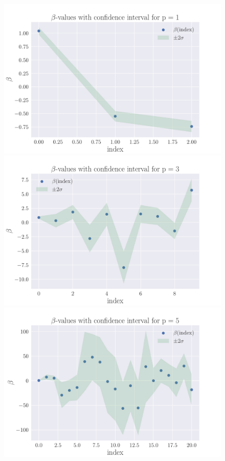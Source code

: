 \documentclass[reprint,english,notitlepage,aps,nobalancelastpage,nofootinbib]{revtex4-1}  %
\begin{document}
\begin{figure}[H]
	\includegraphics[width=\linewidth]{Var_OLS_poldeg_1.pdf}
	\endminipage\hfill
	\includegraphics[width=\linewidth]{Var_OLS_poldeg_3.pdf}
	\endminipage\hfill
	\includegraphics[width=\linewidth]{Var_OLS_poldeg_5.pdf}

\end{figure}
\end{document}
